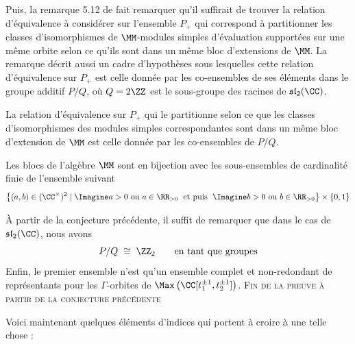Puis, la remarque 5.12 de \cite{NSext} fait remarquer qu'il suffirait de trouver la relation d'équivalence à considérer sur l'ensemble $P_+$ qui correspond à partitionner les classes d'isomorphismes de $\MM$-modules simples d'évaluation supportées sur une même orbite selon ce qu'ils sont dans un même bloc d'extensions de $\MM$. La remarque décrit aussi un cadre d'hypothèses sous lesquelles cette relation d'équivalence sur $P_+$ est celle donnée par les co-ensembles de ses éléments dans le groupe additif $P/Q$, où $Q = 2\ZZ$ est le sous-groupe des racines de $\mathfrak{sl}_2(\CC)$.

\begin{Conj} La relation d'équivalence sur $P_+$ qui le partitionne selon ce que les classes d'isomorphismes des modules simples correspondantes sont dans un même bloc d'extension de $\MM$ est celle donnée par les co-ensembles de $P/Q$.
\end{Conj}

\begin{Conj} Les blocs de l'algèbre $\MM$ sont en bijection avec les sous-ensembles de cardinalité finie de l'ensemble suivant
$$ \big\{(a,b) \in (\CC^\times)^2 \; | \; \Imagine a > 0 \text{ ou } a \in \RR_{> 0} \; \text{ et puis } \; \Imagine b > 0 \text{ ou } b \in \RR_{> 0} \big\} \times \{0,1\} $$
\begin{pre} À partir de la conjecture précédente, il suffit de remarquer que dans le cas de $\mathfrak{sl}_2(\CC)$, nous avons 
$$ P/Q \; \cong \; \ZZ_2 \qquad \text{en tant que groupes} $$
Enfin, le premier ensemble n'est qu'un ensemble complet et non-redondant de représentants pour les $\Gamma$-orbites de $\Max \left(\CC[t_1^{\pm 1},t_2^{\pm 1}]\right)$. \flushright \textsc{Fin de la preuve à partir de la conjecture précédente}
\end{pre}
\end{Conj}

Voici maintenant quelques éléments d'indices qui portent à croire à une telle chose :

